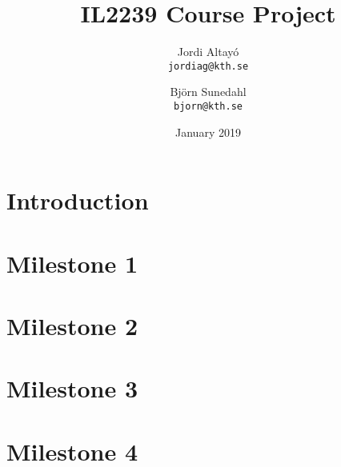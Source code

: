 \documentclass{article}
\title{IL2239 Course Project}
\author{Jordi Altayó \\\texttt{jordiag@kth.se}\and Björn Sunedahl\\\texttt{bjorn@kth.se}}
\date{January 2019}
\begin{document}
 
  \maketitle
  
  \section*{Introduction}
  \section*{Milestone 1}
  \section*{Milestone 2}
  \section*{Milestone 3}
  \section*{Milestone 4}
\end{document}
